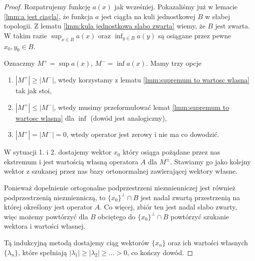 \begin{proof}
  Rozpatrujemy funkcję $a(x)$ jak wcześniej. Pokazaliśmy już w lemacie \ref{lmm:a jest ciagla}, że funkcja $a$ jest ciągła na kuli jednostkowej $B$ w słabej topologii. Z lematu \ref{lmm:kula jednostkowa slabo zwarta} wiemy, że $B$ jest zwarta. W takim razie $\sup_{x\in B} a(x)$ oraz $\inf_{y\in B}a(y)$ są osiągane przez pewne $x_0,y_0\in B$.
  
  Oznaczmy $M^+=\sup a(x)$, $M^-=\inf a(x)$. Mamy trzy opcje
  \begin{enumerate}
    \item $|M^+|\geq|M^-|$, wtedy korzystamy z lematu \ref{lmm:supremum to wartosc wlasna} tak jak stoi,
    \item $|M^+|\leq|M^-|$, wtedy musimy przeformułować lemat \ref{lmm:supremum to wartosc wlasna} dla $\inf$ (dowód jest analogiczny),
    \item $|M^+|=|M^-|=0$, wtedy operator jest zerowy i nie ma co dowodzić.
  \end{enumerate}
  W sytuacji 1. i 2. dostajemy wektor $x_0$ który osiąga pożądane przez nas ekstremum i jest wartością własną operatora $A$ dla $M^\pm$. Stawiamy go jako kolejny wektor z szukanej przez nas bazy ortonormalnej zawierającej wektory własne. 

  Ponieważ dopełnienie ortogonalne podprzestrzeni niezmienniczej jest również podprzestrzenią niezmienniczą, to $\{x_0\}^\perp\cap B$ jest nadal zwartą przestrzenią na której określony jest operator $A$. Co więcej, zbiór ten jest nadal słabo zwarty, więc możemy powtórzyć dla $B$ obciętego do $\{x_0\}^\perp\cap B$ powtórzyć szukanie wektora i wartości własnej. 
  
  Tą indukcyjną metodą dostajemy ciąg wektorów $\{x_n\}$ oraz ich wartości własnych $\{\lambda_n\}$, które spełniają $|\lambda_1|\geq|\lambda_2|\geq...>0$, co kończy dowód.
\end{proof}




